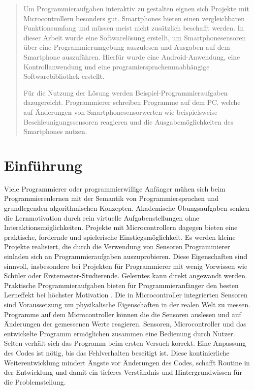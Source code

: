 \documentclass[11pt,a4paper]{report}
\begin{document}

\begin{abstract}
Um Programmieraufgaben interaktiv zu gestalten eignen sich Projekte mit Microcontrollern besonders gut.
Smartphones bieten einen vergleichbaren Funktionsumfang und müssen meist nicht zusätzlich beschafft werden.
In dieser Arbeit wurde eine Softwarelösung erstellt, um Smartphonesensoren über eine Programmierumgebung auszulesen und Ausgaben auf dem Smartphone auszuführen.
Hierfür wurde eine Android-Anwendung, eine Kontrollanwendung und eine programiersprachenunabhängige Softwarebibliothek erstellt.

Für die Nutzung der Lösung werden Beispiel-Programmieraufgaben dazugereicht.
Programmierer schreiben Programme auf dem PC, welche auf Änderungen von Smartphonesensorwerten wie beispielsweise Beschleunigungssensoren reagieren und die Ausgabemöglichkeiten des Smartphones nutzen.
\end{abstract}

\tableofcontents

\chapter{Einführung} \label{chap:intro}
Viele Programmierer oder programmierwillige Anfänger mühen sich beim Programmierenlernen mit der Semantik von Programmiersprachen und grundlegenden algorithmischen Konzepten.
Akademische Übungsaufgaben senken die Lernmotivation durch rein virtuelle Aufgabenstellungen ohne Interaktionsmöglichkeiten.
Projekte mit Microcontrollern dagegen bieten eine praktische, fordernde und spielerische Einstiegsmöglichkeit.
Es werden kleine Projekte realisiert, die durch die Verwendung von Sensoren Programmierer einladen sich an Programmieraufgaben auszuprobieren.
Diese Eigenschaften sind sinnvoll, insbesondere bei Projekten für Programmierer mit wenig Vorwissen wie Schüler oder Erstemester-Studierende.
Gelerntes kann direkt angewandt werden.
Praktische Programmieraufgaben bieten für Programmieranfänger den besten Lerneffekt bei höchster Motivation \cite{learning_computer_programming}.
Die in Microcontroller integrierten Sensoren sind Voraussetzung um physikalische Eigenschaften in der realen Welt zu messen.
Programme auf dem Microcontroller können die die Sensoren auslesen und auf Änderungen der gemessenen Werte reagieren.
Sensoren, Microcontroller und das entwickelte Programm ermöglichen zusammen eine Bedienung durch Nutzer.
Selten verhält sich das Programm beim ersten Versuch korrekt.
Eine Anpassung des Codes ist nötig, bis das Fehlverhalten beseitigt ist.
Diese kontinierliche Weiterentwicklung mindert Ängste vor Änderungen des Codes, schafft Routine in der Entwicklung und damit ein tieferes Verständnis und Hintergrundwissen für die Problemstellung.
\end{document}
